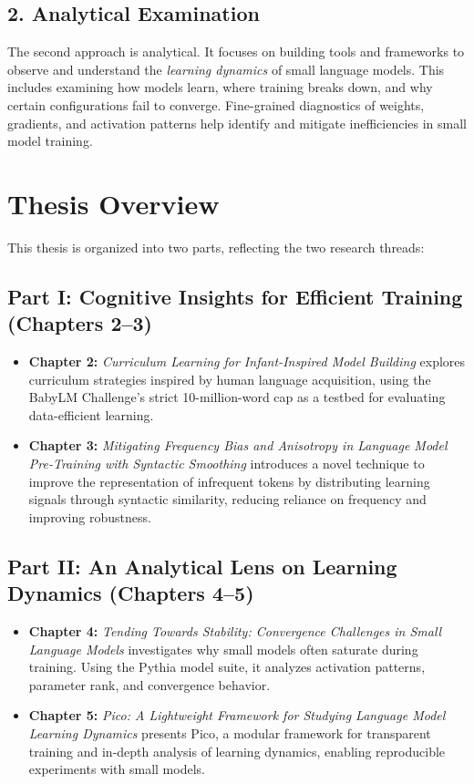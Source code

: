 \subsection*{2. Analytical Examination}

The second approach is analytical. It focuses on building tools and frameworks to observe and understand the \emph{learning dynamics} of small language models. This includes examining how models learn, where training breaks down, and why certain configurations fail to converge. Fine-grained diagnostics of weights, gradients, and activation patterns help identify and mitigate inefficiencies in small model training.

\section*{Thesis Overview}

This thesis is organized into two parts, reflecting the two research threads:

\subsection*{Part I: Cognitive Insights for Efficient Training (Chapters 2–3)}

\begin{itemize}
    \item \textbf{Chapter 2:} \emph{Curriculum Learning for Infant-Inspired Model Building}  
    explores curriculum strategies inspired by human language acquisition, using the BabyLM Challenge’s strict 10-million-word cap as a testbed for evaluating data-efficient learning.

    \item \textbf{Chapter 3:} \emph{Mitigating Frequency Bias and Anisotropy in Language Model Pre-Training with Syntactic Smoothing}  
    introduces a novel technique to improve the representation of infrequent tokens by distributing learning signals through syntactic similarity, reducing reliance on frequency and improving robustness.
\end{itemize}

\subsection*{Part II: An Analytical Lens on Learning Dynamics (Chapters 4–5)}

\begin{itemize}
    \item \textbf{Chapter 4:} \emph{Tending Towards Stability: Convergence Challenges in Small Language Models}  
    investigates why small models often saturate during training. Using the Pythia model suite, it analyzes activation patterns, parameter rank, and convergence behavior.

    \item \textbf{Chapter 5:} \emph{Pico: A Lightweight Framework for Studying Language Model Learning Dynamics}  
    presents Pico, a modular framework for transparent training and in-depth analysis of learning dynamics, enabling reproducible experiments with small models.
\end{itemize}

